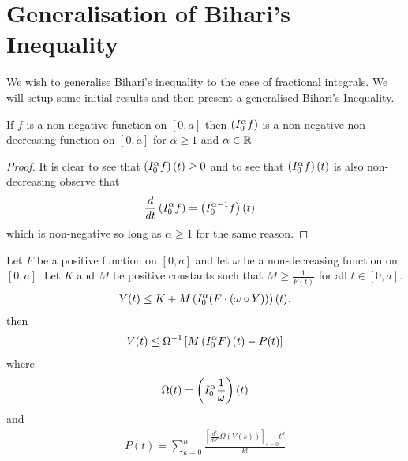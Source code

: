 \documentclass{unswmaths}
\begin{document}
\section*{Generalisation of Bihari's Inequality}
We wish to generalise Bihari's inequality \cite{Bihari1956} to the case of fractional integrals.
We will setup some initial results and then present a generalised Bihari's Inequality.
\begin{lemma}
\label{lem:rli-non-neg}
	If $ f $ is a non-negative function on $ [0, a] $ then $ \left( I_{0}^{\alpha} f \right) $ is a non-negative non-decreasing function on $ [0, a] $ for 
	$ \alpha \geq 1 $ and $ \alpha \in \mathbb{R} $
\end{lemma}
\begin{proof}
	It is clear to see that $ \left( I_{0}^{\alpha} f \right)(t) \geq 0 $ and to see that $ \left( I_{0}^{\alpha} f \right)(t) $ is also non-decreasing
	observe that 
	\begin{align*}
		\frac{d}{dt} \left( I_{0}^{\alpha} f \right) &= \left( I_{0}^{\alpha-1} f \right)(t)
	\end{align*}
	which is non-negative so long as $ \alpha \geq 1 $ for the same reason.
\end{proof}

\begin{theorem}
	Let $ F $ be a positive function on $ [0, a] $ and let $ \omega $ be a non-decreasing function on $ [0 ,a ]. $
	Let $ K $ and $ M $ be positive constants such that $ M \geq \frac{1}{F(t)} $ for all $ t \in [0,a] $.
	\begin{align*}
		Y(t) \leq K + M\left( I_{0}^{\alpha} (F\cdot (\omega \circ Y)) \right)(t).
	\end{align*}
	then
	\begin{align*}
		V(t) \leq \Omega^{-1} \left[ M\left( I_{0}^{\alpha} F \right)(t) - P(t)\right]
	\end{align*}
	where
	\begin{align*}
		\Omega(t) = \left( I_{0}^{\alpha} \frac{1}{\omega} \right)(t)
	\end{align*}
	and
	\begin{align*}
		P(t) = \sum_{k=0}^{n} \frac{\left[\frac{d^k}{ds^k} \Omega(V(s)) \right]_{s=0}t^{k}}{k!}
	\end{align*}
\end{theorem}
\end{document}
